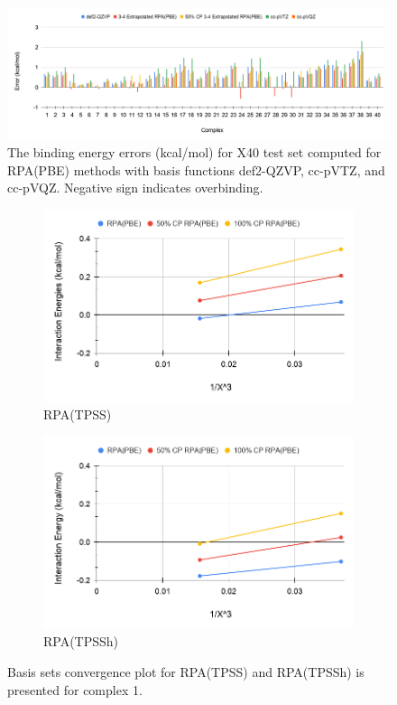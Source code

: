 \documentclass[11pt]{article}
\begin{document}
\begin{figure}[hbpt]
  \centering
  \includegraphics[scale=0.25]{def2-QZVP.png}
  \caption{The binding energy errors (kcal/mol) for X40 test set computed
    for RPA(PBE) methods with basis functions def2-QZVP, cc-pVTZ, and
    cc-pVQZ. Negative sign indicates overbinding.}
  \label{fig:rpa_basis}
\end{figure}

\begin{figure}[hbpt]
  \centering
  \begin{subfigure}{.5\textwidth}
    \centering
    \includegraphics[scale=0.3]{tpss_1.png}
    \caption{RPA(TPSS)}
    \label{fig:tpss_1}
  \end{subfigure}%
  \begin{subfigure}{.5\textwidth}
    \centering
    \includegraphics[scale=0.3]{tpssh_1.png}
    \caption{RPA(TPSSh)}
    \label{fig:tpssh_1}
  \end{subfigure}
  \caption{Basis sets convergence plot for RPA(TPSS)
    and RPA(TPSSh) is presented for complex 1.}
  \label{fig:complex_1}
\end{figure}
\end{document}
